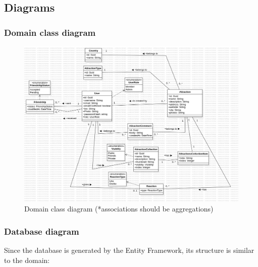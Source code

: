 \clearpage %

\subsection{Diagrams}

\subsubsection{Domain class diagram}

\begin{figure}[!ht]
    \centering
    \includegraphics[width=1\linewidth]{domain-class-diagram.png}
    \caption{Domain class diagram (*associations should be aggregations)}
    \label{fig:enter-label}
\end{figure}

\subsubsection{Database diagram}

\par Since the database is generated by the Entity Framework, its structure is similar to the domain:

\clearpage %

